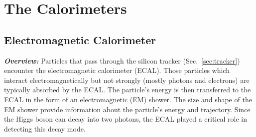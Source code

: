 \section{The Calorimeters}
\label{sec:calo}

\subsection{Electromagnetic Calorimeter}
\label{sec:ecal}

\textit{\textbf{Overview:}}
Particles that pass through the silicon tracker (Sec.~\ref{sec:tracker}) encounter the electromagnetic calorimeter (ECAL).
Those particles which interact electromagnetically but not strongly (\ie mostly photons and electrons) are typically absorbed by the ECAL.
The particle's energy is then transferred to the ECAL in the form of an electromagnetic (EM) shower.
The size and shape of the EM shower provide information about the particle's energy and trajectory.
Since the Higgs boson can decay into two photons, the ECAL played a critical role in detecting this decay mode.

